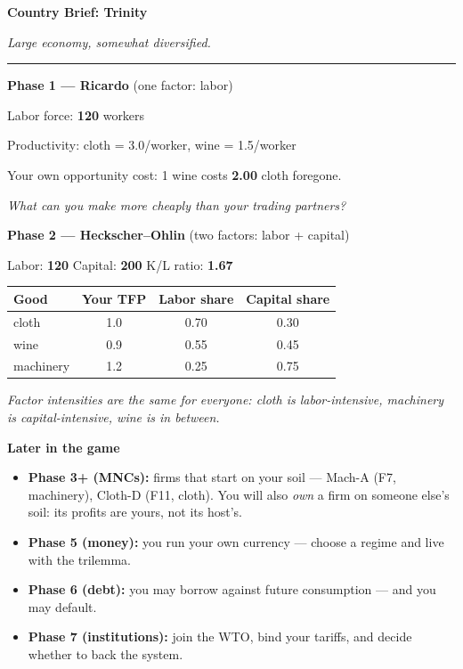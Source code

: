\documentclass[11pt]{article}
\newcommand{\hr}{\par\vspace{2pt}\noindent\rule{\linewidth}{0.4pt}\par\vspace{2pt}}
\begin{document}
\newpage

{\Large\bfseries Country Brief: Trinity}\par
\textit{Large economy, somewhat diversified.}
\hr

{\bfseries Phase 1 --- Ricardo} \hfill (one factor: labor)\par
Labor force: \textbf{120} workers\par
Productivity: cloth = 3.0/worker, wine = 1.5/worker\par
Your own opportunity cost: 1 wine costs \textbf{2.00} cloth foregone.\par
\textit{What can you make more cheaply than your trading partners?}

\vspace{6pt}
{\bfseries Phase 2 --- Heckscher--Ohlin} \hfill (two factors: labor + capital)\par
Labor: \textbf{120} \quad Capital: \textbf{200} \quad K/L ratio: \textbf{1.67}\par
\vspace{2pt}
\begin{tabular}{lccc}
\toprule
Good & Your TFP & Labor share & Capital share \\
\midrule
    cloth & 1.0 & 0.70 & 0.30 \\
    wine & 0.9 & 0.55 & 0.45 \\
    machinery & 1.2 & 0.25 & 0.75 \\
\bottomrule
\end{tabular}\par
\vspace{2pt}
\textit{Factor intensities are the same for everyone: cloth is labor-intensive,
machinery is capital-intensive, wine is in between.}

\vspace{6pt}
{\bfseries Later in the game}\par
\begin{itemize}[nosep,leftmargin=1.4em]
  \item \textbf{Phase 3+ (MNCs):} firms that start on your soil --- Mach-A (F7, machinery), Cloth-D (F11, cloth).
    You will also \emph{own} a firm on someone else's soil: its profits are
    yours, not its host's.
  \item \textbf{Phase 5 (money):} you run your own currency --- choose a regime and live with the trilemma.
  \item \textbf{Phase 6 (debt):} you may borrow against future consumption --- and you may default.
  \item \textbf{Phase 7 (institutions):} join the WTO, bind your tariffs, and decide whether to back the system.
\end{itemize}
\end{document}
